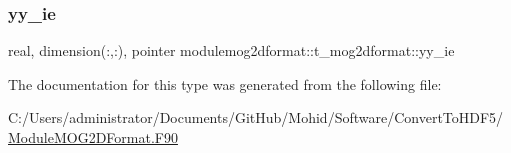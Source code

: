 \mbox{\label{structmodulemog2dformat_1_1t__mog2dformat_a41248acfb8ab70e112639fdb58b0b4c4}} 
\subsubsection{\texorpdfstring{yy\+\_\+ie}{yy\_ie}}
{\footnotesize\ttfamily real, dimension(\+:,\+:), pointer modulemog2dformat\+::t\+\_\+mog2dformat\+::yy\+\_\+ie\hspace{0.3cm}{\ttfamily [private]}}



The documentation for this type was generated from the following file\+:\begin{DoxyCompactItemize}
\item 
C\+:/\+Users/administrator/\+Documents/\+Git\+Hub/\+Mohid/\+Software/\+Convert\+To\+H\+D\+F5/\mbox{\hyperlink{_module_m_o_g2_d_format_8_f90}{Module\+M\+O\+G2\+D\+Format.\+F90}}\end{DoxyCompactItemize}
